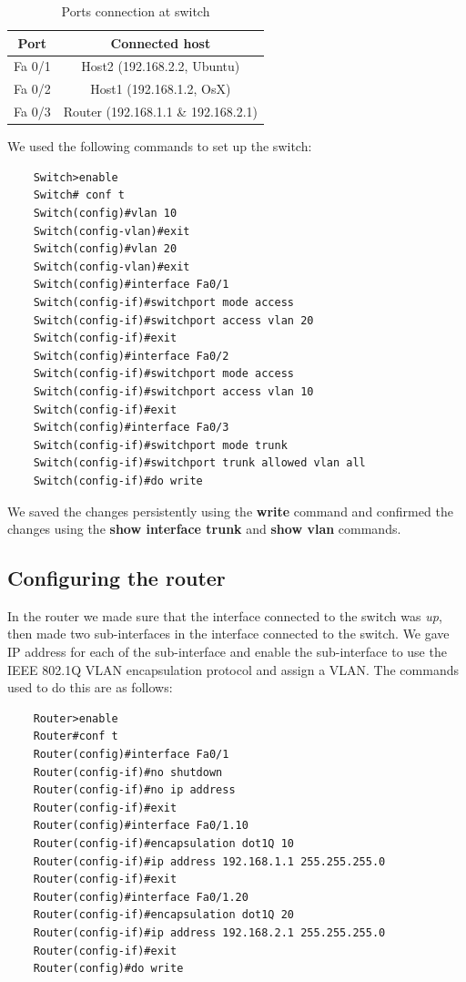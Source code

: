 \documentclass{article}
\begin{document}
\begin{table}[h]
    \centering
    \begin{tabular}{|c|c|}
    \hline
        Port & Connected host \\
        \hline
         Fa 0/1 & Host2 (192.168.2.2, Ubuntu)\\
         Fa 0/2 & Host1 (192.168.1.2, OsX)\\
         Fa 0/3 & Router (192.168.1.1 \& 192.168.2.1)\\
         \hline     
    \end{tabular}
    \caption{Ports connection at switch}
    \label{tab:3portscon}
\end{table}

We used the following commands to set up the switch:
\begin{verbatim}
    Switch>enable
    Switch# conf t
    Switch(config)#vlan 10
    Switch(config-vlan)#exit
    Switch(config)#vlan 20
    Switch(config-vlan)#exit
    Switch(config)#interface Fa0/1
    Switch(config-if)#switchport mode access
    Switch(config-if)#switchport access vlan 20
    Switch(config-if)#exit
    Switch(config)#interface Fa0/2
    Switch(config-if)#switchport mode access
    Switch(config-if)#switchport access vlan 10 
    Switch(config-if)#exit
    Switch(config)#interface Fa0/3
    Switch(config-if)#switchport mode trunk
    Switch(config-if)#switchport trunk allowed vlan all
    Switch(config-if)#do write
\end{verbatim}

We saved the changes persistently using the \textbf{write} command and confirmed the changes using the \textbf{show interface trunk} and \textbf{show vlan} commands.

\subsection{Configuring the router}

In the router we made sure that the interface connected to the switch was \textit{up}, then made two sub-interfaces in the interface connected to the switch. We gave IP address for each of the sub-interface and enable the sub-interface to use the IEEE 802.1Q VLAN encapsulation protocol and assign a VLAN. The commands used to do this are as follows: 

\begin{verbatim}
    Router>enable
    Router#conf t
    Router(config)#interface Fa0/1
    Router(config-if)#no shutdown
    Router(config-if)#no ip address
    Router(config-if)#exit
    Router(config)#interface Fa0/1.10
    Router(config-if)#encapsulation dot1Q 10 
    Router(config-if)#ip address 192.168.1.1 255.255.255.0
    Router(config-if)#exit
    Router(config)#interface Fa0/1.20
    Router(config-if)#encapsulation dot1Q 20 
    Router(config-if)#ip address 192.168.2.1 255.255.255.0
    Router(config-if)#exit
    Router(config)#do write
\end{verbatim}
\end{document}
